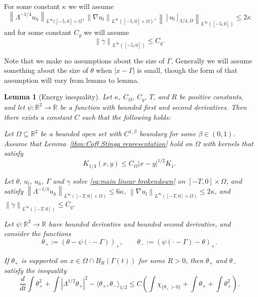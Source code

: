 \documentclass[11pt]{amsart}
\newtheorem{lemma}[theorem]{Lemma}
\theoremstyle{remark}
\theoremstyle{definition}
\newcommand{\R}{\mathbb{R}}
\newcommand{\chevron}[1]{\langle #1 \rangle}
\newcommand{\norm}[1]{\left\lVert#1\right\rVert}
\newcommand{\paren}[1]{\left( #1 \right)}
\newcommand{\bracket}[1]{\left[ #1 \right]}
\newcommand{\abs}[1]{\left\lvert #1 \right\rvert}
\newcommand{\grad}{\nabla}
\newcommand{\ddt}{\frac{d}{dt}}
\newcommand{\Lip}{\text{Lip}}
\newcommand{\indic}[1]{\chi_{\{#1\}}}
\newcommand{\ulow}{u_l}
\newcommand{\uhigh}{u_h}
\newcommand{\Cgamma}{C_g}
\newcommand{\Comega}{C_\Omega}
\begin{document}
For some constant $\kappa$ we will assume
\[ \norm{\Lambda^{-1/4} \uhigh}_{L^\infty([-5,0]\times\Omega}, \norm{\grad \ulow}_{L^\infty([-5,0]\times\Omega)}, \norm{\bracket{\ulow}_{3/4; \Omega} }_{L^\infty([-5,0])} \leq 2 \kappa \]
and for some constant $\Cgamma$ we will assume
\[ \norm{\dot{\gamma}}_{L^\infty([-5,0])} \leq \Cgamma. \]

Note that we make no assumptions about the size of $\Gamma$.  Generally we will assume something about the size of $\theta$ when $|x-\Gamma|$ is small, though the form of that assumption will vary from lemma to lemma.  



\begin{lemma}[Energy inequality] \label{thm:energy inequality}
Let $\kappa$, $\Comega$, $\Cgamma$, $T$, and $R$ be positive constants, and let $\psi:\R^2 \to \R$ be a function with bounded first and second derivatives. Then there exists a constant $C$ such that the following holds:

Let $\Omega \subseteq \R^2$ be a bounded open set with $C^{1,\beta}$ boundary for some $\beta \in (0,1)$.  Assume that Lemma~\ref{thm:Caff Stinga representation} hold on $\Omega$ with kernels that satisfy
\[ K_{1/4}(x,y) \leq \Comega |x-y|^{1/2} K_{1}. \]

Let $\theta$, $\ulow$, $\uhigh$, $\Gamma$ and $\gamma$ solve \eqref{eq:main linear brokendown} on $[-T,0]\times\Omega$, and satisfy $\norm{\Lambda^{-1/4} \uhigh}_{L^\infty([-T,0]\times\Omega)} \leq 6 \kappa$, $\norm{\grad \ulow}_{L^\infty([-T,0]\times\Omega)} \leq 2\kappa$, and $\norm{\dot{\gamma}}_{L^\infty([-T,0])} \leq \Cgamma$.  

Let $\psi:\R^2 \to \R$ have bounded derivative and bounded second derivative, and consider the functions
\[ \theta_+ := \paren{\theta - \psi(\cdot-\Gamma)}_+, \qquad \theta_- := \paren{\psi(\cdot-\Gamma) - \theta}_+. \]

If $\theta_+$ is supported on $x \in \Omega \cap B_R(\Gamma(t))$ for some $R>0$, then $\theta_+$ and $\theta_-$ satisfy the inequality
\[ \ddt \int \theta_+^2 + \int \abs{\Lambda^{1/2} \theta_+}^2 - \chevron{\theta_+,\theta_-}_{1/2} \leq C \paren{ \int \indic{\theta_+ > 0} + \int \theta_+ + \int \theta_+^2 }. \]
\end{lemma}
\end{document}
